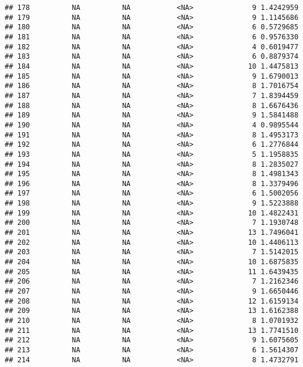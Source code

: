\documentclass[]{article}
\begin{document}
\begin{verbatim}
## 178          NA          NA           <NA>              9 1.4242959
## 179          NA          NA           <NA>              9 1.1145686
## 180          NA          NA           <NA>              6 0.5729685
## 181          NA          NA           <NA>              6 0.9576330
## 182          NA          NA           <NA>              4 0.6019477
## 183          NA          NA           <NA>              6 0.8879374
## 184          NA          NA           <NA>             10 1.4475813
## 185          NA          NA           <NA>              9 1.6790013
## 186          NA          NA           <NA>              8 1.7016754
## 187          NA          NA           <NA>              7 1.8394459
## 188          NA          NA           <NA>              8 1.6676436
## 189          NA          NA           <NA>              9 1.5841488
## 190          NA          NA           <NA>              4 0.9895544
## 191          NA          NA           <NA>              8 1.4953173
## 192          NA          NA           <NA>              6 1.2776844
## 193          NA          NA           <NA>              5 1.1958835
## 194          NA          NA           <NA>              8 1.2835027
## 195          NA          NA           <NA>              8 1.4981343
## 196          NA          NA           <NA>              8 1.3379496
## 197          NA          NA           <NA>              6 1.5002056
## 198          NA          NA           <NA>              9 1.5223888
## 199          NA          NA           <NA>             10 1.4822431
## 200          NA          NA           <NA>              7 1.1930748
## 201          NA          NA           <NA>             13 1.7496041
## 202          NA          NA           <NA>             10 1.4406113
## 203          NA          NA           <NA>              7 1.5142015
## 204          NA          NA           <NA>             10 1.6875835
## 205          NA          NA           <NA>             11 1.6439435
## 206          NA          NA           <NA>              7 1.2162346
## 207          NA          NA           <NA>              9 1.6650446
## 208          NA          NA           <NA>             12 1.6159134
## 209          NA          NA           <NA>             13 1.6162388
## 210          NA          NA           <NA>              8 1.0701932
## 211          NA          NA           <NA>             13 1.7741510
## 212          NA          NA           <NA>              9 1.6075605
## 213          NA          NA           <NA>              6 1.5614307
## 214          NA          NA           <NA>              8 1.4732791

\end{verbatim}
\end{document}
